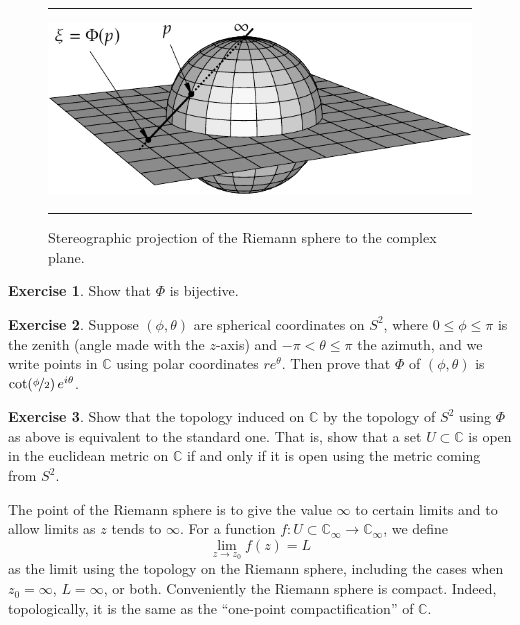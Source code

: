\documentclass[12pt,openany]{book}
\newcommand{\C}{{\mathbb{C}}}
\newcommand{\myquote}[1]{``#1''}
\theoremstyle{plain}
\theoremstyle{remark}
\theoremstyle{definition}
\newenvironment{exbox}{%
    \def\FrameCommand{\vrule width 1pt \relax\hspace{10pt}}%
    \MakeFramed{\advance\hsize-\width\FrameRestore}%
}{%
    \endMakeFramed
}
\newenvironment{myfig}{%
\begin{figure}[h!t]
\noindent\rule{\textwidth}{0.5pt}\vspace{12pt}\par\centering}%
{\par\noindent\rule{\textwidth}{0.5pt}
\end{figure}}
\theoremstyle{exercise}
\newtheorem{exercise}{Exercise}[section]
\theoremstyle{example}
\begin{document}
\begin{myfig}
\includegraphics{figures/riemannsphere}
\caption{Stereographic projection of the Riemann sphere to the complex plane.\label{fig:riemannsphere}}
\end{myfig}

\begin{exbox}
\begin{exercise}%
Show that $\Phi$ is bijective.
\end{exercise}

\begin{exercise}
Suppose $(\phi,\theta)$
are spherical coordinates on $S^2$, where $0 \leq \phi \leq \pi$ is the zenith (angle made
with the $z$-axis) and $-\pi < \theta \leq \pi$ the azimuth, and we write
points in $\C$ using polar coordinates $re^{\theta}$.  Then prove that $\Phi$ of
$(\phi,\theta)$ is $\cot (\nicefrac{\phi}{2})\,e^{i\theta}$.
\end{exercise}

\begin{exercise}%
Show that the topology induced on $\C$ by the topology of $S^2$ using $\Phi$
as above is equivalent to the standard one.  That is, show that a set $U
\subset \C$
is open in the euclidean metric on $\C$ if and only if it is open using the
metric coming from $S^2$.
\end{exercise}
\end{exbox}

The point of the Riemann sphere is to give the value $\infty$ to certain
limits and to allow limits as $z$ tends to $\infty$.  For a
function $f \colon U \subset \C_\infty \to \C_\infty$, we define
\begin{equation*}
\lim_{z \to z_0} f(z) = L
\end{equation*}
as the limit using the topology on the Riemann sphere, 
including
the cases when $z_0 = \infty$, $L = \infty$, or both.
Conveniently the Riemann sphere is compact.
Indeed, topologically, it is the same as the
\myquote{one-point compactification} of $\C$.
\end{document}
